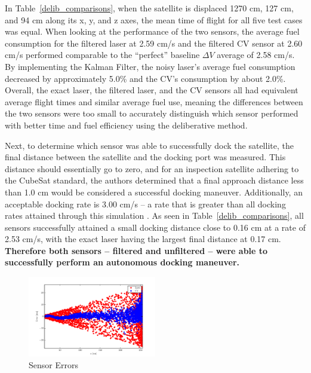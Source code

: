 \documentclass[journal, 10pt]{IEEEtran}
\begin{document}
In Table~\ref{delib_comparisons}, when the satellite is displaced 1270 cm, 127 cm, and 94 cm along its x, y, and z axes, the mean time of flight for all five test cases was equal. When looking at the performance of the two sensors, the average fuel consumption for the filtered laser at 2.59 cm/s and the filtered CV sensor at 2.60 cm/s performed comparable to the ``perfect'' baseline $\Delta V$ average of 2.58 cm/s. By implementing the Kalman Filter, the noisy laser's average fuel consumption decreased by approximately 5.0\% and the CV's consumption by about 2.0\%. Overall, the exact laser, the filtered laser, and the CV sensors all had equivalent average flight times and similar average fuel use, meaning the differences between the two sensors were too small to accurately distinguish which sensor performed with better time and fuel efficiency using the deliberative method.

Next, to determine which sensor was able to successfully dock the satellite, the final distance between the satellite and the docking port was measured. This distance should essentially go to zero, and for an inspection satellite adhering to the CubeSat standard, the authors determined that a final approach distance less than 1.0 cm would be considered a successful docking maneuver. Additionally, an acceptable docking rate is 3.00 cm/s -- a rate that is greater than all docking rates attained through this simulation \cite{approachRate}. As seen in Table~\ref{delib_comparisons}, all sensors successfully attained a small docking distance close to 0.16 cm at a rate of 2.53 cm/s, with the exact laser having the largest final distance at 0.17 cm. \textbf{Therefore both sensors -- filtered and unfiltered -- were able to successfully perform an autonomous docking maneuver. }



\begin{figure}
\begin{center}
\includegraphics[width=0.5\textwidth]{figures/SensorErrors.pdf}
\caption{Sensor Errors}
\label{error}
\end{center}
\end{figure}
\end{document}
